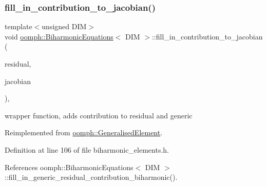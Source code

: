 \mbox{\label{classoomph_1_1BiharmonicEquations_ab96faece91161d22770aba9c3e6747f1}} 
\subsubsection{\texorpdfstring{fill\+\_\+in\+\_\+contribution\+\_\+to\+\_\+jacobian()}{fill\_in\_contribution\_to\_jacobian()}}
{\footnotesize\ttfamily template$<$unsigned D\+IM$>$ \\
void \hyperlink{classoomph_1_1BiharmonicEquations}{oomph\+::\+Biharmonic\+Equations}$<$ D\+IM $>$\+::fill\+\_\+in\+\_\+contribution\+\_\+to\+\_\+jacobian (\begin{DoxyParamCaption}\item[{\hyperlink{classoomph_1_1Vector}{Vector}$<$ double $>$ \&}]{residual,  }\item[{\hyperlink{classoomph_1_1DenseMatrix}{Dense\+Matrix}$<$ double $>$ \&}]{jacobian }\end{DoxyParamCaption})\hspace{0.3cm}{\ttfamily [inline]}, {\ttfamily [virtual]}}



wrapper function, adds contribution to residual and generic 



Reimplemented from \hyperlink{classoomph_1_1GeneralisedElement_a6ae09fc0d68e4309ac1b03583d252845}{oomph\+::\+Generalised\+Element}.



Definition at line 106 of file biharmonic\+\_\+elements.\+h.



References oomph\+::\+Biharmonic\+Equations$<$ D\+I\+M $>$\+::fill\+\_\+in\+\_\+generic\+\_\+residual\+\_\+contribution\+\_\+biharmonic().

\mbox{\label{classoomph_1_1BiharmonicEquations_a04d86cdba2132d715ecc6d1a95e7afa6}} 

